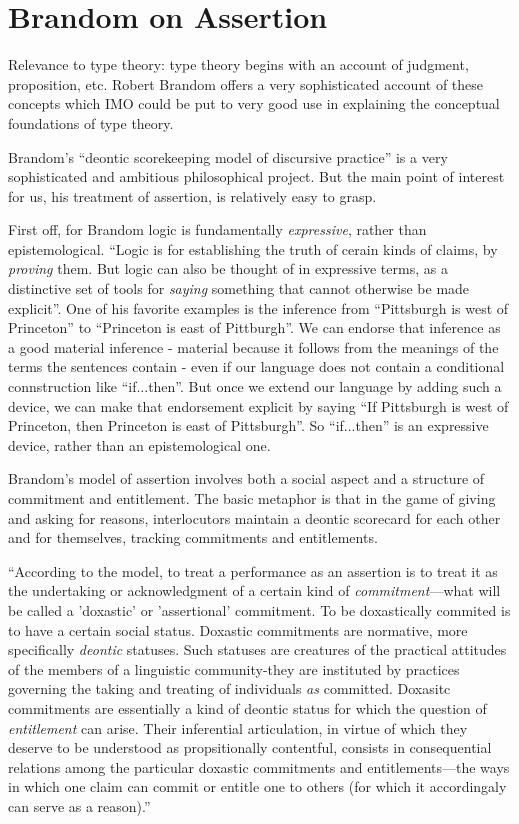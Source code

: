 \section{Brandom on Assertion}

\begin{remark}
  Relevance to type theory: type theory begins with an account of
  judgment, proposition, etc.  Robert Brandom offers a very
  sophisticated account of these concepts which IMO could be put to
  very good use in explaining the conceptual foundations of type
  theory.
\end{remark}

Brandom's ``deontic scorekeeping model of discursive practice'' is a
very sophisticated and ambitious philosophical project.  But the main
point of interest for us, his treatment of assertion, is relatively
easy to grasp.

First off, for Brandom logic is fundamentally \textit{expressive},
rather than epistemological.  ``Logic is for establishing the truth of
cerain kinds of claims, by \textit{proving} them.  But logic can also
be thought of in expressive terms, as a distinctive set of tools for
\textit{saying} something that cannot otherwise be made
explicit''.\citep[19]{brandom_articulating_2001} One of his favorite
examples is the inference from ``Pittsburgh is west of Princeton'' to
``Princeton is east of Pittburgh''.  We can endorse that inference as
a good material inference - material because it follows from the
meanings of the terms the sentences contain - even if our language
does not contain a conditional connstruction like ``if...then''.  But
once we extend our language by adding such a device, we can make that
endorsement explicit by saying ``If Pittsburgh is west of Princeton,
then Princeton is east of Pittsburgh''.  So ``if...then'' is an
expressive device, rather than an epistemological one.

Brandom's model of assertion involves both a
social aspect and a structure of commitment and entitlement.  The
basic metaphor is that in the game of giving and asking for reasons,
interlocutors maintain a deontic scorecard for each other and for
themselves, tracking commitments and entitlements.

``According to the model, to treat a performance as an assertion is to
treat it as the undertaking or acknowledgment of a certain kind of
\textit{commitment}---what will be called a 'doxastic' or 'assertional'
commitment.  To be doxastically commited is to have a certain social
status.  Doxastic commitments are normative, more specifically
\textit{deontic} statuses.  Such statuses are creatures of the
practical attitudes of the members of a linguistic community-they are
instituted by practices governing the taking and treating of
individuals \textit{as} committed.  Doxasitc commitments are
essentially a kind of deontic status for which the question of
\textit{entitlement} can arise.  Their inferential articulation, in
virtue of which they deserve to be understood as propsitionally
contentful, consists in consequential relations among the particular
doxastic commitments and entitlements---the ways in which one claim can
commit or entitle one to others (for which it accordingaly can serve
as a reason).''  \citep[142]{brandom_making_1998}

